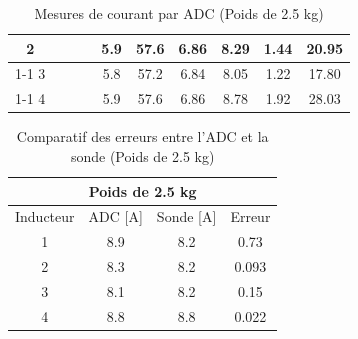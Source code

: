 \begin{table}[H]
{\begin{tabular}{|c|c|c|c|c|c|c|c|c|c|}
            2         &                                                            &                           &                                                         & 5.9                                                      & 57.6                                                    & 6.86                                                                & 8.29                                                  & 1.44   & 20.95                                                              \\ \cline{1-1} \cline{5-10}
            3         &                                                            &                           &                                                         & 5.8                                                      & 57.2                                                    & 6.84                                                                & 8.05                                                  & 1.22   & 17.80                                                              \\ \cline{1-1} \cline{5-10}
            4         &                                                            &                           &                                                         & 5.9                                                      & 57.6                                                    & 6.86                                                                & 8.78                                                  & 1.92   & 28.03                                                              \\ \hline
        \end{tabular}%
    }
    \caption{Mesures de courant par ADC (Poids de 2.5 kg)}
    \label{tab:poids_2_5_adc}
\end{table}

\begin{table}[H]
    \centering
    \begin{tabular}{|c|c|c|c|}
        \hline
        \multicolumn{4}{|c|}{\textbf{Poids de 2.5 kg}}   \\ \hline
        Inducteur & ADC {[}A{]} & Sonde {[}A{]} & Erreur \\ \hline
        1         & 8.9         & 8.2           & 0.73   \\ \hline
        2         & 8.3         & 8.2           & 0.093  \\ \hline
        3         & 8.1         & 8.2           & 0.15   \\ \hline
        4         & 8.8         & 8.8           & 0.022  \\ \hline
    \end{tabular}
    \caption{Comparatif des erreurs entre l'ADC et la sonde (Poids de 2.5 kg)}
    \label{tab:poids_2_5_comp}
\end{table}

